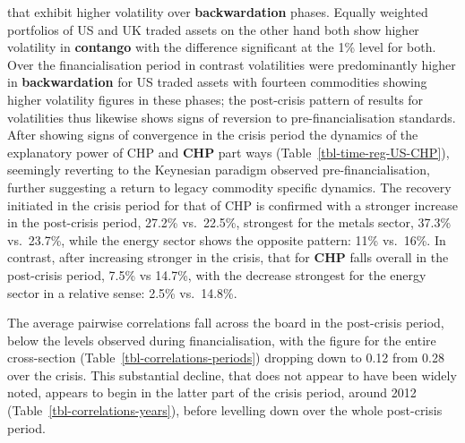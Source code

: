 \documentclass[
  authoryear,
  preprint,
  3p]{elsarticle}
\begin{document}
that exhibit higher volatility over \textbf{backwardation} phases.
Equally weighted portfolios of US and UK traded assets on the other hand
both show higher volatility in \textbf{contango} with the difference
significant at the 1\% level for both. Over the financialisation period
in contrast volatilities were predominantly higher in
\textbf{backwardation} for US traded assets with fourteen commodities
showing higher volatility figures in these phases; the post-crisis
pattern of results for volatilities thus likewise shows signs of
reversion to pre-financialisation standards. After showing signs of
convergence in the crisis period the dynamics of the explanatory power
of CHP and \textbf{CHP} part ways (Table~\ref{tbl-time-reg-US-CHP}),
seemingly reverting to the Keynesian paradigm observed
pre-financialisation, further suggesting a return to legacy commodity
specific dynamics. The recovery initiated in the crisis period for that
of CHP is confirmed with a stronger increase in the post-crisis period,
27.2\% vs.~22.5\%, strongest for the metals sector, 37.3\% vs.~23.7\%,
while the energy sector shows the opposite pattern: 11\% vs.~16\%. In
contrast, after increasing stronger in the crisis, that for \textbf{CHP}
falls overall in the post-crisis period, 7.5\% vs 14.7\%, with the
decrease strongest for the energy sector in a relative sense: 2.5\%
vs.~14.8\%.

\medskip

The average pairwise correlations fall across the board in the
post-crisis period, below the levels observed during financialisation,
with the figure for the entire cross-section
(Table~\ref{tbl-correlations-periods}) dropping down to 0.12 from 0.28
over the crisis. This substantial decline, that does not appear to have
been widely noted, appears to begin in the latter part of the crisis
period, around 2012 (Table~\ref{tbl-correlations-years}), before
levelling down over the whole post-crisis period.

\medskip
\end{document}
